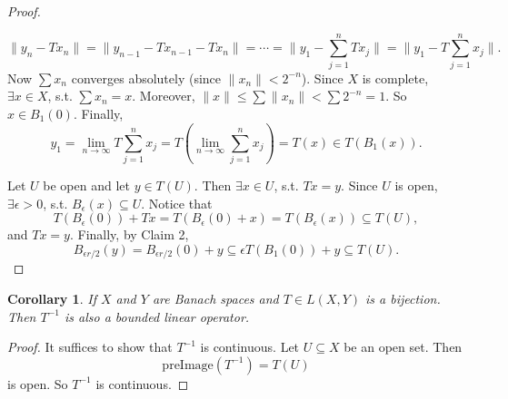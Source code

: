 \documentclass[12pt]{article}
\theoremstyle{plain}
\newtheorem*{corollary}{Corollary}
\theoremstyle{definition}
\begin{document}
\begin{proof}
\begin{description}
            \[
                \|y_n - Tx_n\| = \|y_{n-1} - Tx_{n-1} - Tx_n\| = \cdots = \|y_1 - \sum_{j=1}^n Tx_j\| = \|y_1 -
                T\sum_{j=1}^n x_j\|.
            \]
            Now $\sum x_n$ converges absolutely (since $\|x_n\|<2^{-n}$).
            Since $X$ is complete, $\exists x\in X$, s.t. $\sum x_n = x$.
            Moreover, $\|x\|\leq \sum \|x_n\| < \sum 2^{-n} = 1$.
            So $x\in B_1(0)$.
            Finally,
            \[
                y_1 = \lim_{n\rightarrow\infty} T\sum_{j=1}^n x_j = T(\lim_{n\rightarrow\infty} \sum_{j=1}^n x_j) = T(x)
                \in T(B_1(x)).
            \]
    \end{description}
    Let $U$ be open and let $y\in T(U)$.
    Then $\exists x\in U$, s.t. $Tx=y$.
    Since $U$ is open, $\exists \epsilon > 0$, s.t. $B_\epsilon(x)\subseteq U$.
    Notice that
    \[
        T(B_{\epsilon}(0)) + Tx = T(B_{\epsilon}(0) + x) = T(B_\epsilon(x)) \subseteq T(U),
    \]
    and $Tx=y$.
    Finally, by Claim 2, 
    \[
        B_{\epsilon r/2}(y) = B_{\epsilon r/2}(0) + y \subseteq \epsilon T(B_1(0)) + y \subseteq T(U).
    \]
\end{proof}

\begin{corollary}
    If $X$ and $Y$ are Banach spaces and $T\in L(X,Y)$ is a bijection.
    Then $T^{-1}$ is also a bounded linear operator.
\end{corollary}
\begin{proof}
    It suffices to show that $T^{-1}$ is continuous.
    Let $U\subseteq X$ be an open set.
    Then
    \[
        \text{preImage}(T^{-1}) = T(U)
    \]
    is open.
    So $T^{-1}$ is continuous.
\end{proof}
\end{document}
